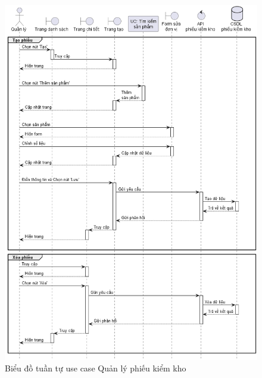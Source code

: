 \documentclass[../DoAn.tex]{subfiles}
\begin{document}
\begin{figure}[H]
    \centering
    \includegraphics[width=1\textwidth]{Hinhve/sequences/AuditReportManage.png}
    \caption{Biểu đồ tuần tự use case Quản lý phiếu kiểm kho}
    \label{figure:sd-auditreport-manage}
\end{figure}
\break
\end{document}

